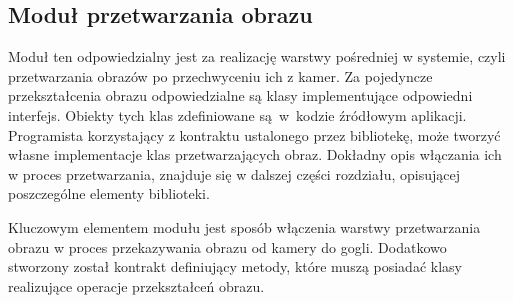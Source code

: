 \documentclass[a4paper,11pt,twoside]{report}
\theoremstyle{definition}
\begin{document}
\subsection{Moduł przetwarzania obrazu}

Moduł ten odpowiedzialny jest za realizację warstwy pośredniej w  systemie, czyli przetwarzania obrazów po przechwyceniu ich z kamer. Za pojedyncze przekształcenia obrazu odpowiedzialne są klasy implementujące odpowiedni interfejs. Obiekty tych klas zdefiniowane są~w~kodzie źródłowym aplikacji. Programista korzystający z kontraktu ustalonego przez bibliotekę, może tworzyć własne implementacje klas przetwarzających obraz. Dokładny opis włączania ich w proces przetwarzania, znajduje się w dalszej części rozdziału, opisującej poszczególne elementy biblioteki.

Kluczowym elementem modułu jest sposób włączenia warstwy przetwarzania obrazu w proces przekazywania obrazu od kamery do gogli. Dodatkowo stworzony został kontrakt definiujący metody, które muszą posiadać klasy realizujące operacje przekształceń obrazu.

\end{document}
